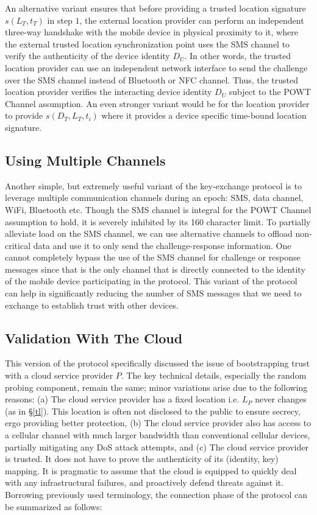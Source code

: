 \documentclass[letterpaper,twocolumn]{sig-alternate}
\begin{document}
An alternative variant ensures that before providing a trusted location signature $s(L_T,t_T)$ in step $1$, the external location provider can perform an independent three-way handshake with the mobile device in physical proximity to it, where the external trusted location synchronization point uses the SMS channel to verify the authenticity of the device identity $D_U$. In other words, the trusted location provider can use an independent network interface to send the challenge over the SMS channel instead of Bluetooth or NFC channel. Thus, the trusted location provider verifies the interacting device identity $D_U$ subject to the POWT Channel assumption. An even stronger variant would be for the location provider to provide $s(D_T, L_T, t_i)$ where it provides a device specific time-bound location signature. 

\subsection{Using Multiple Channels}
\label{multi-path}

Another simple, but extremely useful variant of the key-exchange protocol is to leverage multiple communication channels during an epoch: SMS, data channel, WiFi, Bluetooth etc. Though the SMS channel is integral for the POWT Channel assumption to hold, it is severely inhibited by its 160 character limit. To partially alleviate load on the SMS channel, we can use alternative channels to offload non-critical data and use it to only send the challenge-response information. One cannot completely bypass the use of the SMS channel for challenge or response messages since that is the only channel that is directly connected to the identity of the mobile device participating in the protocol. This variant of the protocol can help in significantly reducing the number of SMS messages that we need to exchange to establish trust with other devices. 

\subsection{Validation With The Cloud} 
\label{cv}

This version of the protocol specifically discussed the issue of bootstrapping trust with a cloud service provider $P$. The key technical details, especially the random probing component, remain the same; minor variations arise due to the following reasons: (a) The cloud service provider has a fixed location i.e. $L_P$ never changes (as in \S \ref{tl}). This location is often not disclosed to the public to ensure secrecy, ergo providing better protection, (b)  The cloud service provider also has access to a cellular channel with much larger bandwidth than conventional cellular devices, partially mitigating any DoS attack attempts, and (c) The cloud service provider is trusted. It does not have to prove the authenticity of its (identity, key) mapping. It is pragmatic to assume that the cloud is equipped to quickly deal with any infrastructural failures, and proactively defend threats against it. Borrowing previously used terminology, the connection phase of the protocol can be summarized as follows: 
\end{document}
